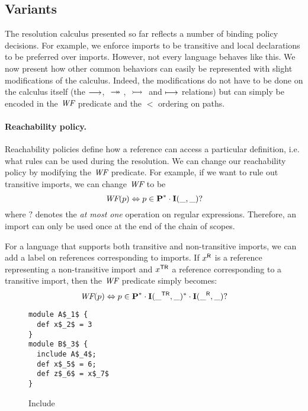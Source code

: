\subsection{Variants}

The resolution calculus presented so far reflects a number of binding policy decisions.
For example, we enforce imports to be transitive and
local declarations to be preferred over imports.
However, not every language behaves like this. We now present how
other common behaviors can easily be represented with slight modifications of
the calculus.
Indeed, the modifications do not have to be done on the calculus itself (the
$\stackrel{}{\longrightarrow}$, $\medge$, $\reach$ and $\longmapsto$ relations) but can simply be encoded
in the $\mbox{\it{WF}}$ predicate and the $<$ ordering on paths.

\paragraph{Reachability policy.}

Reachability policies define how a reference can access a particular
definition, i.e. what rules can be used during the resolution. We 
can change our reachability policy by modifying the $\mbox{\it{WF}}$ predicate. 
For example, if we want to rule out transitive imports, we can change $\mbox{\it{WF}}$ to be
\vspace*{-0.4\baselineskip}
$$ \WF(p) \Leftrightarrow p \in \pstep^* \cdot \istep{\_}{\_}? \vspace*{-0.4\baselineskip}
$$ 
where $?$ denotes the \emph{at most one} operation on regular expressions.
Therefore, an import can only be used once at the end of the chain of scopes.

For a language that supports both transitive and non-transitive imports, we can add a
label on references corresponding to imports.
If ${x}^{\mbox{\scriptsize\sf R}}$ is a reference representing a non-transitive import and ${x}^{\mbox{\scriptsize\sf TR}}$
a reference corresponding to a transitive import, then the $\mbox{\it{WF}}$ predicate
simply becomes:
\vspace*{-0.4\baselineskip}
$$ \WF(p) \Leftrightarrow p \in \pstep^* \cdot \istep{\tr{\_}}{\_}^*\cdot
\istep{\r{\_}}{\_}? \vspace*{-0.4\baselineskip}$$ 

\begin{wrapfigure}[7]{r}{0.2\textwidth}
\vspace*{-0.7\baselineskip}
\begin{lstlisting}[language=PCFM]
module A$_1$ {
  def x$_2$ = 3
}
module B$_3$ {
  include A$_4$;
  def x$_5$ = 6;
  def z$_6$ = x$_7$
} 
\end{lstlisting}
\vspace*{-0.7\baselineskip}
\caption{Include}
\label{fig:include}
\end{wrapfigure}

